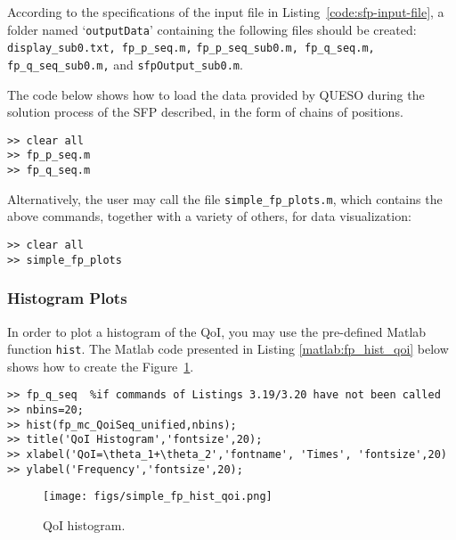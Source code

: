 According to the specifications of the input file in Listing~\ref{code:sfp-input-file}, a folder named `\verb+outputData+' containing the following files should be created: \verb+display_sub0.txt, fp_p_seq.m,+ \linebreak \verb+fp_p_seq_sub0.m, fp_q_seq.m, fp_q_seq_sub0.m,+ and \verb+sfpOutput_sub0.m+.

The code below shows how to load the data provided by QUESO during the solution
process of the SFP described, in the form of chains of positions.
\begin{lstlisting}[caption={Matlab code for loading the data in both parameter and QoI chains of the SFP.}]
% inside Matlab
>> clear all
>> fp_p_seq.m
>> fp_q_seq.m
\end{lstlisting}


Alternatively, the user may call the file \texttt{simple\_fp\_plots.m}, which
contains the above commands, together with a variety of others, for data
visualization:
\begin{lstlisting}[caption={Matlab code for loading the data in both parameter and QoI chains of the SFP, by calling the file \texttt{simple\_fp\_plots.m}.}]
% inside Matlab
>> clear all
>> simple_fp_plots
\end{lstlisting}




\subsubsection{Histogram Plots}

In order to plot a histogram of the QoI, you may use the pre-defined Matlab function \verb+hist+.
The Matlab code presented in Listing \ref{matlab:fp_hist_qoi} below shows how to create the Figure~\ref{fig:fp_qoi_hist}.

\begin{lstlisting}[label=matlab:fp_hist_qoi,caption={Matlab code for the QoI histogram plot.}]
% inside Matlab
>> fp_q_seq  %if commands of Listings 3.19/3.20 have not been called
>> nbins=20;
>> hist(fp_mc_QoiSeq_unified,nbins);
>> title('QoI Histogram','fontsize',20);
>> xlabel('QoI=\theta_1+\theta_2','fontname', 'Times', 'fontsize',20)
>> ylabel('Frequency','fontsize',20);
\end{lstlisting}

\begin{figure}[p]
\centering 
\texttt{[image: figs/simple\_fp\_hist\_qoi.png]}
\vspace{-10pt}
\caption{QoI histogram.}
\label{fig:fp_qoi_hist}
\end{figure}

